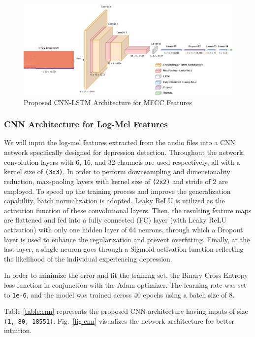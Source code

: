 

\begin{figure}[!t]
    \centerline{\includegraphics[width=\columnwidth]{images/CNN-LSTM.png}}
    \caption{Proposed CNN-LSTM Architecture for MFCC Features}
    \label{fig:cnn_lstm}
\end{figure}

\subsubsection{CNN Architecture for Log-Mel Features}

We will input the log-mel features extracted from the audio files into a CNN network specifically designed for depression detection. Throughout the network, convolution layers with 6, 16, and 32 channels are used respectively, all with a kernel size of \texttt{(3x3)}. In order to perform downsampling and dimensionality reduction, max-pooling layers with kernel size of \texttt{(2x2)} and stride of 2 are employed. To speed up the training process and improve the generalization capability, batch normalization is adopted. Leaky ReLU is utilized as the activation function of these convolutional layers. Then, the resulting feature maps are flattened and fed into a fully connected (FC) layer (with Leaky ReLU activation) with only one hidden layer of 64 neurons, through which a Dropout layer is used to enhance the regularization and prevent overfitting. Finally, at the last layer, a single neuron goes through a Sigmoid activation function reflecting the likelihood of the individual experiencing depression.

In order to minimize the error and fit the training set, the Binary Cross Entropy loss function in conjunction with the Adam optimizer. The learning rate was set to \texttt{1e-6}, and the model was trained across 40 epochs using a batch size of 8.

Table \ref{table:cnn} represents the proposed CNN architecture having inputs of size \texttt{(1, 80, 18551)}. Fig.~\ref{fig:cnn} visualizes the network architecture for better intuition.

